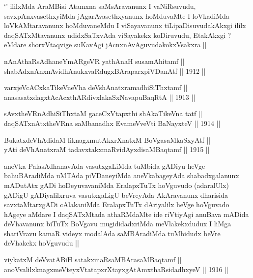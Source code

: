 \begin{artha}
`\stext' ililxMda AraMBisi Atamxna saMsAravanunx I vaNiRsuvudu,
  savxpAnxvasethxyiMda jAgarAvasethxyanunx hoMduvaMte I loVkadiMda
  loVkAMtaravanunx hoMduvaneMdu I viSayavanunx tiLipaDisuvudakAkxgi
  ililx daqSATxMtavanunx udidxSaTxvAda viSayakekx koDiruvudu,
  EtakAkxgi ? eMdare shorxVtaqvige suKavAgi jAcnxnAvAguvudakokxVsakxra ||
\end{artha}


\begin{shl}
nAnAthaRsAdhaneYmARgeVR yathA\s naH susamAhitamf || \\
shabAdxnAnxnAvidhAnukxvaRdugxBAraparxpiVDanAtf ||  1912 ||  
\end{shl}

\begin{shl}
varxjeVcACxkaTikeVneVha deVshAnatxramadhiSiThxtamf || \\
anasasatxdagxtAcAcxthARdivxlakaSxNavapuBaqRtA ||  1913 ||  
\end{shl}
				
\begin{shl}
sAvxtheVRnAdhiSiThxtaM gaceCxVtapxthi shAkaTikeVna tatf || \\
daqSATxnAtxtheVRna saMbanadhx EvameVveVti BaNayxteV ||  1914 ||  
\end{shl}
				
\begin{shl}
BukatxdeVhAdidaM liknagxmutAkxrXnatxM BoVgasaMkaSxyAtf || \\
yAti deVhAnatxraM tadavxtakxmaRvidAyxdisaMBaqtamf ||  1915 ||  
\end{shl}

\begin{artha}
aneVka PalasAdhanavAda vasutxgaLiMda tuMbida gADiyu heVge
bahuBAradiMda uMTAda piVDaneyiMda aneVkabageyAda shabadxgalanunx
mADutAtx gADi hoDeyuvavaniMda EralapxTuTx hoVguvudo (adaralUlx) gADigU
gADiyalilxruva vasutxgaLigU beVreyAda AkAravanunx dharisida
savxtaMtarxgADi cAlakaniMda EralapxTuTx dAriyalilx heVge hoVguvado
hAgeye aMdare I daqSATxMtada athaRMdaMte ide riVtiyAgi anuBava mADida
deVhavanunx biTuTx BoVgavu mugididadxriMda meVlakekxdudux I liMga
shariVravu kamaR videyx modalAda saMBAradiMda tuMbidudx beVre
deVhakekx hoVguvudu ||
\end{artha}

\begin{shl}
viykatxM deVvatABiH satakxmaRsaMBArasaMBaqtamf || \\
anoVvalilxknagxmeVteyxVtatapxrXtayxgAtAmxthaRsidadhxyeV ||  1916 ||  
\end{shl}

